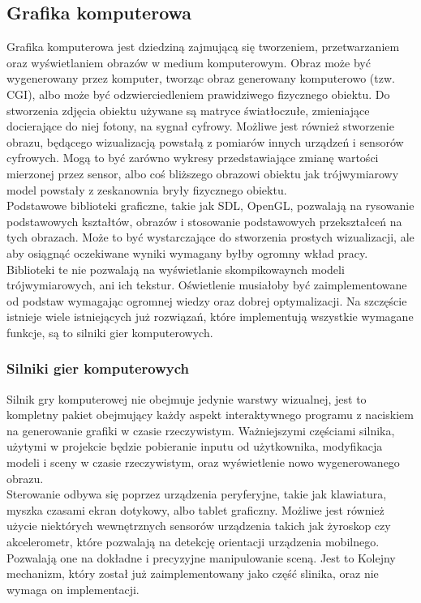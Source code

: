 \documentclass{article} %
\begin{document}
    \subsection{Grafika komputerowa}
        Grafika komputerowa jest dziedziną zajmującą się tworzeniem, przetwarzaniem oraz wyświetlaniem obrazów w medium komputerowym. Obraz może być wygenerowany przez komputer, tworząc obraz generowany komputerowo (tzw. CGI), albo może być odzwierciedleniem prawidziwego fizycznego obiektu. Do stworzenia zdjęcia obiektu używane są matryce światłoczułe, zmieniające docierające do niej fotony, na sygnał cyfrowy. Możliwe jest również stworzenie obrazu, będącego wizualizacją powstałą z pomiarów innych urządzeń i sensorów cyfrowych. Mogą to być zarówno wykresy przedstawiające zmianę wartości mierzonej przez sensor, albo coś bliższego obrazowi obiektu jak trójwymiarowy model powstały z zeskanownia bryły fizycznego obiektu.
        \\
        
        Podstawowe biblioteki graficzne, takie jak SDL, OpenGL, pozwalają na rysowanie podstawowych kształtów, obrazów i stosowanie podstawowych przekształceń na tych obrazach. Może to być wystarczające do stworzenia prostych wizualizacji, ale aby osiągnąć oczekiwane wyniki wymagany byłby ogromny wkład pracy. Biblioteki te nie pozwalają na wyświetlanie skompikowaynch modeli trójwymiarowych, ani ich tekstur. Oświetlenie musiałoby być zaimplementowane od podstaw wymagając ogromnej wiedzy oraz dobrej optymalizacji. Na szczęście istnieje wiele istniejących już rozwiązań, które implementują wszystkie wymagane funkcje, są to silniki gier komputerowych.
        \\

        
        \subsubsection{Silniki gier komputerowych}
        Silnik gry komputerowej nie obejmuje jedynie warstwy wizualnej, jest to kompletny pakiet obejmujący każdy aspekt interaktywnego programu z naciskiem na generowanie grafiki w czasie rzeczywistym. Ważniejszymi częściami silnika, użytymi w projekcie będzie pobieranie inputu od użytkownika, modyfikacja modeli i sceny w czasie rzeczywistym, oraz wyświetlenie nowo wygenerowanego obrazu.
        \\
        
        Sterowanie odbywa się poprzez urządzenia peryferyjne, takie jak klawiatura, myszka czasami ekran dotykowy, albo tablet graficzny. Możliwe jest również użycie niektórych wewnętrznych sensorów urządzenia takich jak żyroskop czy akcelerometr, które pozwalają na detekcję orientacji urządzenia mobilnego. Pozwalają one na dokładne i precyzyjne manipulowanie sceną. Jest to Kolejny mechanizm, który został już zaimplementowany jako część slinika, oraz nie wymaga on implementacji.
        \\
        
\end{document}
